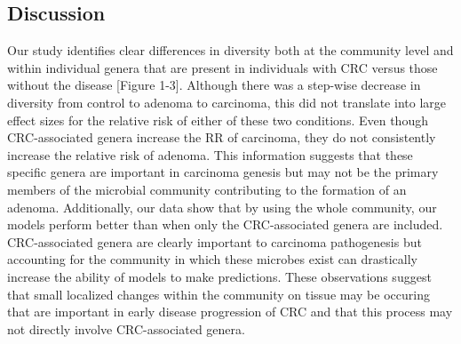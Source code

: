 \documentclass[12pt,]{article}
\begin{document}
\newpage

\subsection{Discussion}\label{discussion}

Our study identifies clear differences in diversity both at the
community level and within individual genera that are present in
individuals with CRC versus those without the disease {[}Figure 1-3{]}.
Although there was a step-wise decrease in diversity from control to
adenoma to carcinoma, this did not translate into large effect sizes for
the relative risk of either of these two conditions. Even though
CRC-associated genera increase the RR of carcinoma, they do not
consistently increase the relative risk of adenoma. This information
suggests that these specific genera are important in carcinoma genesis
but may not be the primary members of the microbial community
contributing to the formation of an adenoma. Additionally, our data show
that by using the whole community, our models perform better than when
only the CRC-associated genera are included. CRC-associated genera are
clearly important to carcinoma pathogenesis but accounting for the
community in which these microbes exist can drastically increase the
ability of models to make predictions. These observations suggest that
small localized changes within the community on tissue may be occuring
that are important in early disease progression of CRC and that this
process may not directly involve CRC-associated genera.
\end{document}
